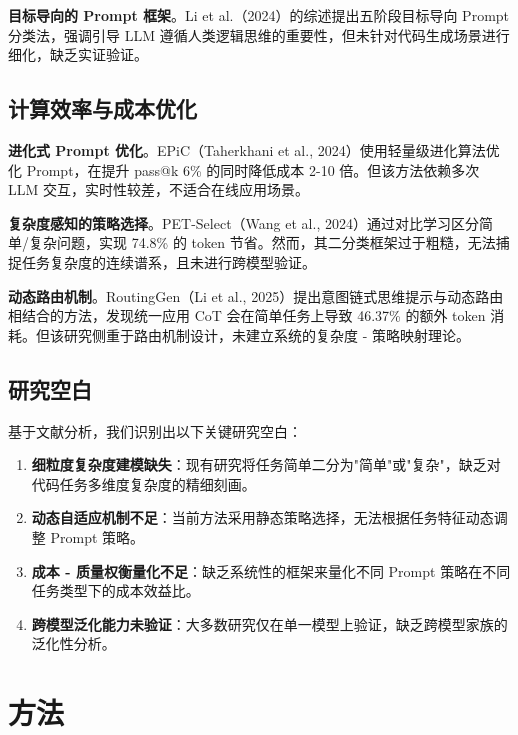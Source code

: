 \documentclass[11pt,a4paper]{article}
\begin{document}
\textbf{目标导向的 Prompt 框架}。Li et al.（2024）的综述提出五阶段目标导向 Prompt 分类法，强调引导 LLM 遵循人类逻辑思维的重要性，但未针对代码生成场景进行细化，缺乏实证验证。

\subsection{计算效率与成本优化}

\textbf{进化式 Prompt 优化}。EPiC（Taherkhani et al., 2024）使用轻量级进化算法优化 Prompt，在提升 pass@k 6\% 的同时降低成本 2-10 倍。但该方法依赖多次 LLM 交互，实时性较差，不适合在线应用场景。

\textbf{复杂度感知的策略选择}。PET-Select（Wang et al., 2024）通过对比学习区分简单/复杂问题，实现 74.8\% 的 token 节省。然而，其二分类框架过于粗糙，无法捕捉任务复杂度的连续谱系，且未进行跨模型验证。

\textbf{动态路由机制}。RoutingGen（Li et al., 2025）提出意图链式思维提示与动态路由相结合的方法，发现统一应用 CoT 会在简单任务上导致 46.37\% 的额外 token 消耗。但该研究侧重于路由机制设计，未建立系统的复杂度 - 策略映射理论。

\subsection{研究空白}

基于文献分析，我们识别出以下关键研究空白：

\begin{enumerate}[leftmargin=*]
    \item \textbf{细粒度复杂度建模缺失}：现有研究将任务简单二分为"简单"或"复杂"，缺乏对代码任务多维度复杂度的精细刻画。
    
    \item \textbf{动态自适应机制不足}：当前方法采用静态策略选择，无法根据任务特征动态调整 Prompt 策略。
    
    \item \textbf{成本 - 质量权衡量化不足}：缺乏系统性的框架来量化不同 Prompt 策略在不同任务类型下的成本效益比。
    
    \item \textbf{跨模型泛化能力未验证}：大多数研究仅在单一模型上验证，缺乏跨模型家族的泛化性分析。
\end{enumerate}

\section{方法}
\end{document}
